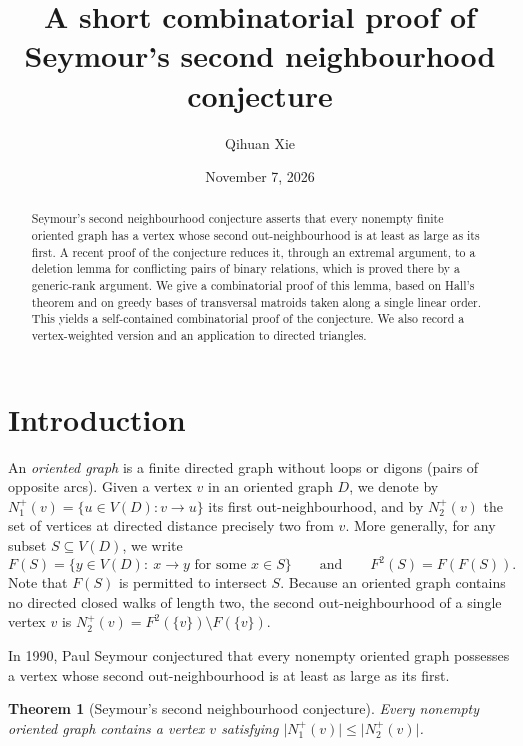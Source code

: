 \documentclass[11pt]{amsart}
\title[A short combinatorial proof of Seymour's conjecture]{A short combinatorial proof of\\ Seymour's second neighbourhood conjecture}
\author{Qihuan Xie}
\date{November 7, 2026}
\newtheorem{theorem}{Theorem}[section]
\theoremstyle{remark}
\newcommand{\abs}[1]{\lvert #1\rvert}
\begin{document}
\begin{abstract}
Seymour's second neighbourhood conjecture asserts that every nonempty finite oriented graph has a vertex whose second out-neighbourhood is at least as large as its first. A recent proof of the conjecture reduces it, through an extremal argument, to a deletion lemma for conflicting pairs of binary relations, which is proved there by a generic-rank argument. We give a combinatorial proof of this lemma, based on Hall's theorem and on greedy bases of transversal matroids taken along a single linear order. This yields a self-contained combinatorial proof of the conjecture. We also record a vertex-weighted version and an application to directed triangles.
\end{abstract}

\maketitle

\section{Introduction}

An \emph{oriented graph} is a finite directed graph without loops or digons (pairs of opposite arcs). Given a vertex $v$ in an oriented graph $D$, we denote by $N_1^+(v)=\{u\in V(D):v\to u\}$ its first out-neighbourhood, and by $N_2^+(v)$ the set of vertices at directed distance precisely two from $v$. More generally, for any subset $S\subseteq V(D)$, we write
\[
  F(S)=\{y\in V(D):\ x\to y\text{ for some }x\in S\}\qquad\text{and}\qquad F^2(S)=F(F(S)).
\]
Note that $F(S)$ is permitted to intersect $S$. Because an oriented graph contains no directed closed walks of length two, the second out-neighbourhood of a single vertex $v$ is $N_2^+(v)=F^2(\{v\})\setminus F(\{v\})$.

In 1990, Paul Seymour conjectured that every nonempty oriented graph possesses a vertex whose second out-neighbourhood is at least as large as its first.

\begin{theorem}[Seymour's second neighbourhood conjecture]\label{thm:main}
Every nonempty oriented graph contains a vertex $v$ satisfying $\abs{N_1^+(v)}\le\abs{N_2^+(v)}$.
\end{theorem}
\end{document}
